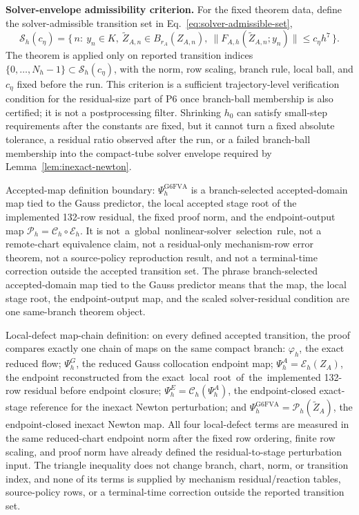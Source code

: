 \documentclass[preprint,12pt]{elsarticle}
\begin{document}
\noindent\textbf{Solver-envelope admissibility criterion.}
For the fixed theorem data, define the solver-admissible transition set
in Eq.~\eqref{eq:solver-admissible-set},
\begin{equation}
\label{eq:solver-admissible-set}
  \mathcal S_h(c_\eta)=
  \{\,n:\ y_n\in K,\ \widetilde Z_{A,n}\in B_{r_A}(Z_{A,n}),\
  \|F_{A,h}(\widetilde Z_{A,n};y_n)\|\le c_\eta h^7\,\}.
\end{equation}
The theorem is applied only on reported transition indices
\(\{0,\ldots,N_h-1\}\subset\mathcal S_h(c_\eta)\), with the norm, row
scaling, branch rule, local ball, and \(c_\eta\) fixed before the run.  This
criterion is a sufficient trajectory-level verification condition for the
residual-size part of P6 once branch-ball membership is also certified; it is not a
postprocessing filter.  Shrinking \(h_0\) can satisfy small-step requirements
after the constants are fixed, but it cannot turn a fixed absolute tolerance,
a residual ratio observed after the run, or a failed branch-ball membership
into the compact-tube solver envelope required by
Lemma~\ref{lem:inexact-newton}.

Accepted-map definition boundary: \(\Psi_h^{\mathrm{G6FVA}}\)
is a branch-selected accepted-domain map tied to the Gauss predictor, the local accepted
stage root of the implemented 132-row residual, the fixed proof norm, and the
endpoint-output map \(\mathcal P_h=\mathcal C_h\circ\mathcal E_h\). It is
\mbox{not a global nonlinear-solver selection rule}, not a remote-chart equivalence claim,
not a residual-only mechanism-row error theorem, not a source-policy
reproduction result, and not a terminal-time correction outside the accepted
transition set.
The phrase branch-selected accepted-domain map tied to the Gauss predictor
means that the map, the local stage root, the endpoint-output map, and the
scaled solver-residual condition are one same-branch theorem object.

Local-defect map-chain definition: on every defined accepted
transition, the proof compares exactly one chain of maps on the same compact
branch: \(\varphi_h\), the exact reduced flow; \(\Psi_h^G\), the reduced Gauss
collocation endpoint map; \(\Psi_h^A=\mathcal E_h(Z_A)\), the endpoint
reconstructed from the \mbox{exact local root of the implemented} 132-row residual
before endpoint closure; \(\Psi_h^E=\mathcal C_h(\Psi_h^A)\), the
endpoint-closed exact-stage reference for the inexact Newton perturbation; and
\(\Psi_h^{\mathrm{G6FVA}}=\mathcal P_h(\widetilde Z_A)\), the
endpoint-closed inexact Newton map. All four
local-defect terms are measured in the same reduced-chart endpoint norm after
the fixed row ordering, finite row scaling, and proof norm have already
defined the residual-to-stage perturbation input. The triangle inequality
does not change branch, chart, norm, or transition index, and none of its
terms is supplied by mechanism residual/reaction tables, source-policy rows,
or a terminal-time correction outside the reported transition set.
\end{document}
